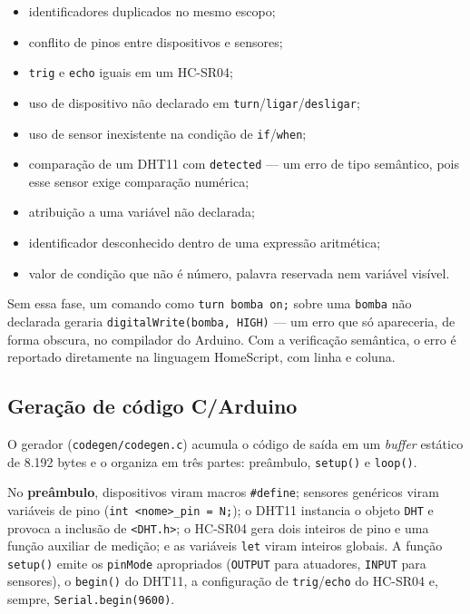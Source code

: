 \documentclass[conference]{IEEEtran}
\begin{document}
\begin{itemize}
\item identificadores duplicados no mesmo escopo;
\item conflito de pinos entre dispositivos e sensores;
\item \texttt{trig} e \texttt{echo} iguais em um HC-SR04;
\item uso de dispositivo não declarado em \texttt{turn}/\texttt{ligar}/\texttt{desligar};
\item uso de sensor inexistente na condição de \texttt{if}/\texttt{when};
\item comparação de um DHT11 com \texttt{detected} --- um erro de tipo
semântico, pois esse sensor exige comparação numérica;
\item atribuição a uma variável não declarada;
\item identificador desconhecido dentro de uma expressão aritmética;
\item valor de condição que não é número, palavra reservada nem variável
visível.
\end{itemize}

Sem essa fase, um comando como \texttt{turn bomba on;} sobre uma
\texttt{bomba} não declarada geraria \texttt{digitalWrite(bomba, HIGH)} ---
um erro que só apareceria, de forma obscura, no compilador do Arduino. Com
a verificação semântica, o erro é reportado diretamente na linguagem
HomeScript, com linha e coluna.

\subsection{Geração de código C/Arduino}

O gerador (\texttt{codegen/codegen.c}) acumula o código de saída em um
\emph{buffer} estático de 8.192 bytes e o organiza em três partes:
preâmbulo, \texttt{setup()} e \texttt{loop()}.

No \textbf{preâmbulo}, dispositivos viram macros \texttt{\#define}; sensores
genéricos viram variáveis de pino (\texttt{int <nome>\_pin = N;}); o DHT11
instancia o objeto \texttt{DHT} e provoca a inclusão de \texttt{<DHT.h>}; o
HC-SR04 gera dois inteiros de pino e uma função auxiliar de medição; e as
variáveis \texttt{let} viram inteiros globais. A função \texttt{setup()}
emite os \texttt{pinMode} apropriados (\texttt{OUTPUT} para atuadores,
\texttt{INPUT} para sensores), o \texttt{begin()} do DHT11, a configuração
de \texttt{trig}/\texttt{echo} do HC-SR04 e, sempre,
\texttt{Serial.begin(9600)}.
\end{document}
